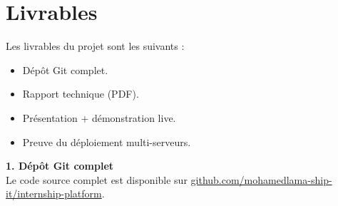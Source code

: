 \documentclass[11pt,a4paper]{article}
\begin{document}
\section{Livrables}

Les livrables du projet sont les suivants :

\begin{itemize}
    \item D\'ep\^ot Git complet.
    \item Rapport technique (PDF).
    \item Pr\'esentation + d\'emonstration live.
    \item Preuve du d\'eploiement multi-serveurs.
\end{itemize}

\begin{center}
\setlength{\fboxsep}{12pt}
\colorbox{green!14}{\parbox{0.95\textwidth}{
\textbf{\textcolor{green!45!black}{1. D\'ep\^ot Git complet}}\\[0.4em]
Le code source complet est disponible sur
\href{https://github.com/mohamedlama-ship-it/internship-platform}{github.com/mohamedlama-ship-it/internship-platform}.
}}
\end{center}
\end{document}
